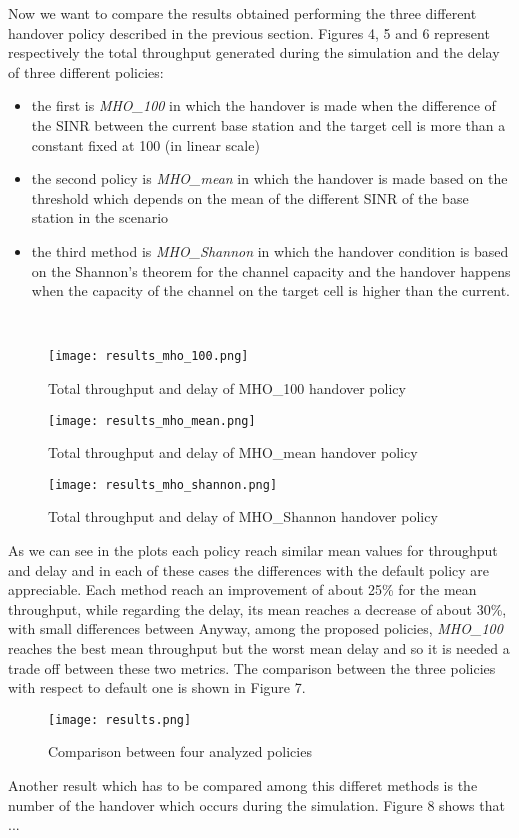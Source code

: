 \documentclass[conference,10pt]{IEEEtran}
\begin{document}
Now we want to compare the results obtained performing the three different handover policy described in the previous section.
Figures 4, 5 and 6 represent respectively the total throughput generated during the simulation and the delay of three different policies: 
\begin{itemize}
\item the first is \textit{MHO_100} in which the handover is made when the difference of the SINR between the current base station and the target cell is more than a constant fixed at 100 (in linear scale)
\item the second policy is \textit{MHO_mean} in which the handover is made based on the threshold which depends on the mean of the different SINR of the base station in the scenario
\item the third method is \textit{MHO_Shannon} in which the handover condition is based on the Shannon's theorem for the channel capacity and the handover happens when the capacity of the channel on the target cell is higher than the current. 
\end{itemize}
\
\begin{figure*}[h]
\texttt{[image: results\_mho\_100.png]}
\caption{Total throughput and delay of MHO_100 handover policy}
\end{figure*}
\begin{figure*}[h]
\texttt{[image: results\_mho\_mean.png]}
\caption{Total throughput and delay of MHO_mean handover policy}
\end{figure*}
\begin{figure*}[h]
\texttt{[image: results\_mho\_shannon.png]}
\caption{Total throughput and delay of MHO_Shannon handover policy}
\end{figure*}
As we can see in the plots each policy reach similar mean values for throughput and delay and in each of these cases the differences with the default policy are appreciable. Each method reach an improvement of about 25\% for the mean throughput, while regarding the delay, its mean reaches a decrease of about 30\%, with small differences between  Anyway, among the proposed policies, \textit{MHO_100} reaches the best mean throughput but the worst mean delay and so it is needed a trade off between these two metrics.
The comparison between the three policies with respect to default one is shown in Figure 7.
\begin{figure*}[h]
\texttt{[image: results.png]}
\caption{Comparison between four analyzed policies}
\end{figure*}
Another result which has to be compared among this differet methods is the number of the handover which occurs during the simulation. Figure 8 shows that ...
\end{document}
